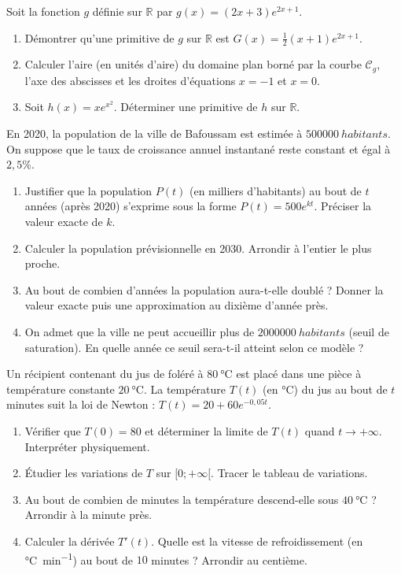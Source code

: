 \documentclass[11pt]{article}
\begin{document}
\begin{exercice}
Soit la fonction $g$ définie sur $\mathbb{R}$ par $g(x) = (2x+3)e^{2x+1}$.
\begin{enumerate}
    \item Démontrer qu'une primitive de $g$ sur $\mathbb{R}$ est $G(x) = \frac{1}{2}(x+1)e^{2x+1}$.
    \item Calculer l'aire (en unités d'aire) du domaine plan borné par la courbe $\mathcal{C}_g$, l'axe des abscisses et les droites d'équations $x = -1$ et $x = 0$.
    \item Soit $h(x) = x e^{x^2}$. Déterminer une primitive de $h$ sur $\mathbb{R}$.
\end{enumerate}
\end{exercice}

\begin{exercice}
En 2020, la population de la ville de Bafoussam est estimée à $\SI{500000}{habitants}$. On suppose que le taux de croissance annuel instantané reste constant et égal à $2,5\%$.
\begin{enumerate}
    \item Justifier que la population $P(t)$ (en milliers d'habitants) au bout de $t$ années (après 2020) s'exprime sous la forme $P(t) = 500 e^{kt}$. Préciser la valeur exacte de $k$.
    \item Calculer la population prévisionnelle en 2030. Arrondir à l'entier le plus proche.
    \item Au bout de combien d'années la population aura-t-elle doublé ? Donner la valeur exacte puis une approximation au dixième d'année près.
    \item On admet que la ville ne peut accueillir plus de $\SI{2000000}{habitants}$ (seuil de saturation). En quelle année ce seuil sera-t-il atteint selon ce modèle ?
\end{enumerate}
\end{exercice}

\begin{exercice}
Un récipient contenant du jus de foléré à $\SI{80}{\celsius}$ est placé dans une pièce à température constante $\SI{20}{\celsius}$. La température $T(t)$ (en \si{\celsius}) du jus au bout de $t$ minutes suit la loi de Newton : $T(t) = 20 + 60 e^{-0,05 t}$.
\begin{enumerate}
    \item Vérifier que $T(0) = 80$ et déterminer la limite de $T(t)$ quand $t \to +\infty$. Interpréter physiquement.
    \item Étudier les variations de $T$ sur $[0; +\infty[$. Tracer le tableau de variations.
    \item Au bout de combien de minutes la température descend-elle sous $\SI{40}{\celsius}$ ? Arrondir à la minute près.
    \item Calculer la dérivée $T'(t)$. Quelle est la vitesse de refroidissement (en \si{\celsius\per\minute}) au bout de $10$ minutes ? Arrondir au centième.
\end{enumerate}
\end{exercice}
\end{document}
